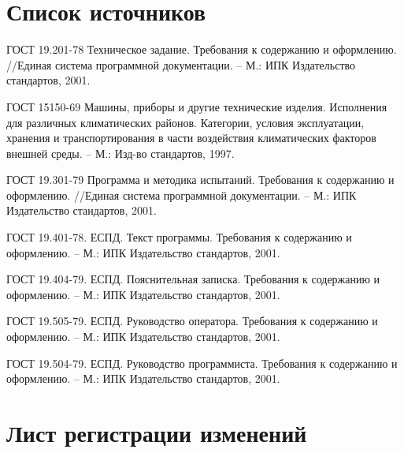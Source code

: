 \documentclass[a4paper,12pt,reqno]{article}
\begin{document}
    \section{Список источников}
    \begin{thebibliography}{3}
         ГОСТ 19.201-78 Техническое задание. Требования к содержанию и оформлению. //Единая система программной документации. – М.: ИПК Издательство стандартов, 2001.

         ГОСТ 15150-69 Машины, приборы и другие технические изделия. Исполнения для различных климатических районов. Категории, условия эксплуатации, хранения и транспортирования в части воздействия климатических факторов внешней среды. – М.: Изд-во стандартов, 1997.

         ГОСТ 19.301-79 Программа и методика испытаний. Требования к содержанию и оформлению. //Единая система программной документации. – М.: ИПК Издательство стандартов, 2001.

         ГОСТ 19.401-78. ЕСПД. Текст программы. Требования к содержанию и оформлению. – М.: ИПК Издательство стандартов, 2001.

         ГОСТ 19.404-79. ЕСПД. Пояснительная записка. Требования к содержанию и оформлению. – М.: ИПК Издательство стандартов, 2001.

         ГОСТ 19.505-79. ЕСПД. Руководство оператора. Требования к содержанию и оформлению. – М.: ИПК Издательство стандартов, 2001.

         ГОСТ 19.504-79. ЕСПД. Руководство программиста. Требования к содержанию и оформлению. – М.: ИПК Издательство стандартов, 2001.
    \end{thebibliography}

    \newpage
    \section*{Лист регистрации изменений}
    \listRegistration
\end{document}
